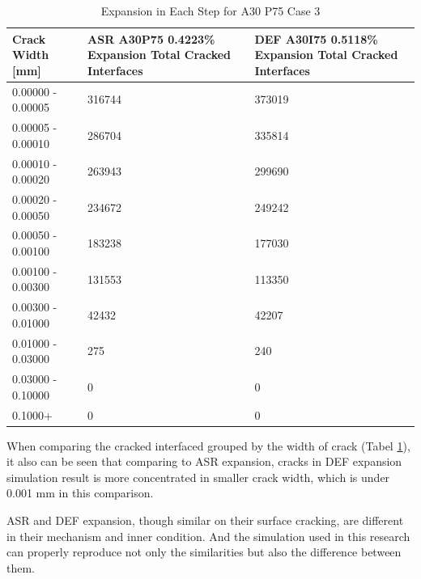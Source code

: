 \begin{table}[!h]
  \caption{Expansion in Each Step for A30 P75 Case 3}
\centering
\begin{tabular}{ |p{4cm}|p{5cm}|p{5cm}| }
\hline
 Crack Width [mm] &  ASR A30P75 0.4223\% Expansion Total Cracked Interfaces  &  DEF A30I75 0.5118\% Expansion Total Cracked Interfaces \\
 \hline\hline

   0.00000 - 0.00005 & 316744 & 373019 \\
   0.00005 - 0.00010 & 286704 & 335814\\
   0.00010 - 0.00020 & 263943 & 299690\\
   0.00020 - 0.00050 & 234672 & 249242\\
   0.00050 - 0.00100 & 183238 & 177030\\
   0.00100 - 0.00300 & 131553 & 113350\\
   0.00300 - 0.01000 & 42432 & 42207\\
   0.01000 - 0.03000 & 275 & 240\\
   0.03000 - 0.10000 & 0 & 0\\
   0.1000+ & 0 & 0\\

  \hline
  \end{tabular}

\label{table:A30P75_3_Cracks}
\end{table}


When comparing the cracked interfaced grouped by the width of crack (Tabel \ref{table:A30P75_3_Cracks}), it also can be seen that comparing to ASR expansion, cracks in DEF expansion simulation result is more concentrated in smaller crack width,  which is under 0.001 mm in this comparison.


ASR and DEF expansion, though similar on their surface cracking, are different in their mechanism and inner condition. And the simulation used in this research can properly reproduce not only the similarities but also the difference between them.
